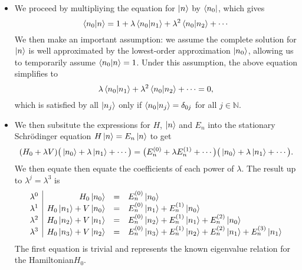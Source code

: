\documentclass[11pt, a4paper]{article}
\newcommand{\Schro}{Schr\"{o}dinger\xspace}
\newcommand{\Ham}{Hamiltonian\xspace}
\begin{document}
\begin{itemize}
    \item We proceed by multipliying the equation for $ \ket{n} $ by $ \bra{n_{0}} $, which gives
    \begin{equation*}
        \braket{n_{0}}{n} = 1 + \lambda \braket{n_{0}}{n_{1}} + \lambda^{2}\braket{n_{0}}{n_{2}} + \cdots
    \end{equation*}
    We then make an important assumption: we assume the complete solution for $ \ket{n} $ is well approximated by the lowest-order approximation $ \ket{n_{0}} $, allowing us to temporarily assume $ \braket{n_{0}}{n} = 1 $. Under this assumption, the above equation simplifies to
    \begin{equation*}
        \lambda \braket{n_{0}}{n_{1}} + \lambda^{2}\braket{n_{0}}{n_{2}} + \cdots = 0,
    \end{equation*}
    which is satisfied by all $ \ket{n_{j}} $ only if $ \braket{n_{0}}{n_{j}} = \delta_{0j} $ for all $ j \in \mathbb{N} $.

    \item We then subsitute the expressions for $ H $, $ \ket{n} $ and $ E_{n} $ into the stationary \Schro equation $ H \ket{n} = E_{n} \ket{n} $ to get
    \begin{equation*}
        (H_{0} + \lambda V)\big( \ket{n_{0}} + \lambda \ket{n_{1}}  + \cdots \big) = \big( E_{n}^{(0)} + \lambda E_{n}^{(1)} + \cdots \big)\big( \ket{n_{0}} + \lambda \ket{n_{1}} + \cdots \big).
    \end{equation*}
    We then equate then equate the coefficients of each power of $ \lambda $. The result up to $ \lambda^{j} = \lambda^{3} $ is
    \begin{equation*}
        \begin{array}{l|r c l}
            \lambda^{0} & H_{0} \ket{n_{0}} & = & E_{n}^{(0)} \ket{n_{0}}\\
            \lambda^{1} & H_{0}\ket{n_{1}} + V \ket{n_{0}} & = & E_{n}^{(0)}\ket{n_{1}} + E_{n}^{(1)}\ket{n_{0}}\\
            \lambda^{2} & H_{0}\ket{n_{2}} + V \ket{n_{1}} & = & E_{n}^{(0)}\ket{n_{2}} + E_{n}^{(1)}\ket{n_{1}} + E_{n}^{(2)}\ket{n_{0}}\\
            \lambda^{3} & H_{0}\ket{n_{3}} + V \ket{n_{2}} & = & E_{n}^{(0)}\ket{n_{3}} + E_{n}^{(1)}\ket{n_{2}} + E_{n}^{(2)}\ket{n_{1}} + E_{n}^{(3)}\ket{n_{1}}
        \end{array}
    \end{equation*}
    The first equation is trivial and represents the known eigenvalue relation for the \Ham $ H_{0} $. 


\end{itemize}
\end{document}
